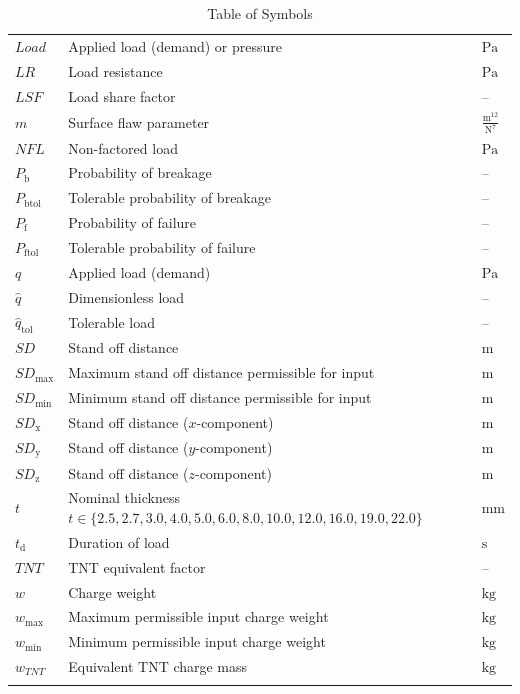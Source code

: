 \documentclass[12pt]{article}
\begin{document}
\begin{longtabu}{l X[l] l}
$\mathit{Load}$ & Applied load (demand) or pressure & ${\text{Pa}}$
\\
$\mathit{LR}$ & Load resistance & ${\text{Pa}}$
\\
$\mathit{LSF}$ & Load share factor & --
\\
$m$ & Surface flaw parameter & $\frac{\text{m}^{12}}{\text{N}^{7}}$
\\
$\mathit{NFL}$ & Non-factored load & ${\text{Pa}}$
\\
${P_{\text{b}}}$ & Probability of breakage & --
\\
${P_{\text{b}\text{tol}}}$ & Tolerable probability of breakage & --
\\
${P_{\text{f}}}$ & Probability of failure & --
\\
${P_{\text{f}\text{tol}}}$ & Tolerable probability of failure & --
\\
$q$ & Applied load (demand) & ${\text{Pa}}$
\\
$\hat{q}$ & Dimensionless load & --
\\
${\hat{q}_{\text{tol}}}$ & Tolerable load & --
\\
$\mathit{SD}$ & Stand off distance & ${\text{m}}$
\\
${\mathit{SD}_{\text{max}}}$ & Maximum stand off distance permissible for input & ${\text{m}}$
\\
${\mathit{SD}_{\text{min}}}$ & Minimum stand off distance permissible for input & ${\text{m}}$
\\
${\mathit{SD}_{\text{x}}}$ & Stand off distance ($x$-component) & ${\text{m}}$
\\
${\mathit{SD}_{\text{y}}}$ & Stand off distance ($y$-component) & ${\text{m}}$
\\
${\mathit{SD}_{\text{z}}}$ & Stand off distance ($z$-component) & ${\text{m}}$
\\
$t$ & Nominal thickness $t\in{}\{2.5,2.7,3.0,4.0,5.0,6.0,8.0,10.0,12.0,16.0,19.0,22.0\}$ & ${\text{mm}}$
\\
${t_{\text{d}}}$ & Duration of load & ${\text{s}}$
\\
$\mathit{TNT}$ & TNT equivalent factor & --
\\
$w$ & Charge weight & ${\text{kg}}$
\\
${w_{\text{max}}}$ & Maximum permissible input charge weight & ${\text{kg}}$
\\
${w_{\text{min}}}$ & Minimum permissible input charge weight & ${\text{kg}}$
\\
${w_{\mathit{TNT}}}$ & Equivalent TNT charge mass & ${\text{kg}}$
\\
\bottomrule
\caption{Table of Symbols}
\label{Table:ToS}
\end{longtabu}
\end{document}
